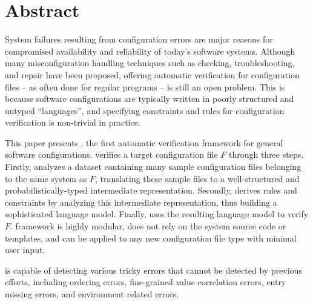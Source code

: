 
\section*{Abstract}

System failures resulting from configuration errors 
are major reasons for compromised availability and
reliability of today's software systems.
Although many misconfiguration handling techniques
such as checking, troubleshooting, and repair
have been proposed, 
offering automatic verification for configuration files -- as often  
done for regular programs -- is still an open problem.
This is because software configurations are typically written in
poorly structured and untyped ``languages'', and 
specifying constraints and rules for configuration 
verification is non-trivial in practice.

This paper presents \app, the first automatic verification framework for
general software configurations.
\app verifies a target configuration file $F$ through three steps.
Firstly, \app analyzes a dataset containing many sample configuration 
files belonging to the same system as $F$,
translating these sample files to a
well-structured and probabilistically-typed 
intermediate representation.
Secondly, \app derives rules and constraints by analyzing
this intermediate representation, thus building a
sophisticated language model.
Finally, \app uses the resulting language model to verify $F$.
\app framework is highly modular, 
does not rely on the system source code or templates, and
can be applied to any new configuration file type with minimal user input. 

\app is capable of detecting various tricky errors that cannot
be detected by previous efforts,
including ordering errors, fine-grained value correlation errors, 
entry missing errors, and environment related errors. 
